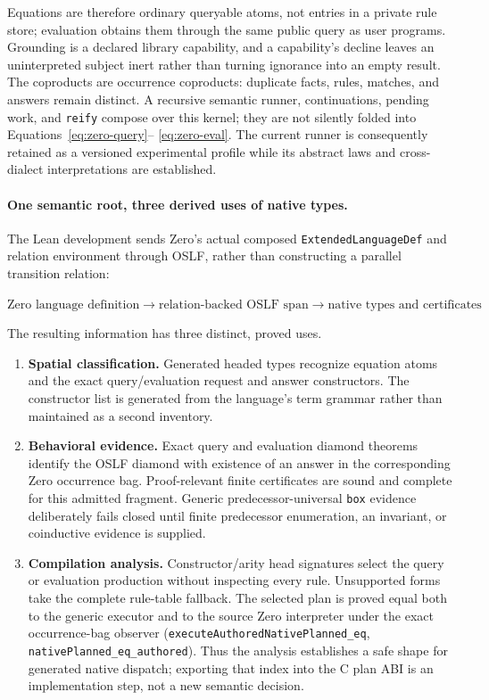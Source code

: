 \documentclass[11pt]{article}
\newcommand{\code}[1]{\texttt{#1}}
\begin{document}
Equations are therefore ordinary queryable atoms, not entries in a private
rule store; evaluation obtains them through the same public query as user
programs.  Grounding is a declared library capability, and a capability's
decline leaves an uninterpreted subject inert rather than turning ignorance
into an empty result.  The coproducts are occurrence coproducts: duplicate
facts, rules, matches, and answers remain distinct.  A recursive semantic
runner, continuations, pending work, and \code{reify} compose over this
kernel; they are not silently folded into Equations~\ref{eq:zero-query}--
\ref{eq:zero-eval}.  The current runner is consequently retained as a
versioned experimental profile while its abstract laws and cross-dialect
interpretations are established.

\paragraph{One semantic root, three derived uses of native types.}
The Lean development sends Zero's actual composed
\code{ExtendedLanguageDef} and relation environment through OSLF, rather
than constructing a parallel transition relation:

\begin{center}
$\text{Zero language definition}
  \longrightarrow \text{relation-backed OSLF span}
  \longrightarrow \text{native types and certificates}$
\end{center}

\noindent
The resulting information has three distinct, proved uses.

\begin{enumerate}
\item \textbf{Spatial classification.}  Generated headed types recognize
  equation atoms and the exact query/evaluation request and answer
  constructors.  The constructor list is generated from the language's term
  grammar rather than maintained as a second inventory.
\item \textbf{Behavioral evidence.}  Exact query and evaluation diamond
  theorems identify the OSLF diamond with existence of an answer in the
  corresponding Zero occurrence bag.
  Proof-relevant finite certificates are sound and complete for this
  admitted fragment.  Generic predecessor-universal \code{box} evidence
  deliberately fails closed until finite predecessor enumeration, an
  invariant, or coinductive evidence is supplied.
\item \textbf{Compilation analysis.}  Constructor/arity head signatures
  select the query or evaluation production without inspecting every rule.
  Unsupported forms take the complete rule-table fallback.  The selected
  plan is proved equal both to the generic executor and to the source
  Zero interpreter under the exact occurrence-bag observer
  (\code{executeAuthoredNativePlanned\_eq},
  \code{nativePlanned\_eq\_authored}).  Thus the analysis establishes a
  safe shape for generated native dispatch; exporting that index into the
  C plan ABI is an implementation step, not a new semantic decision.
\end{enumerate}
\end{document}

